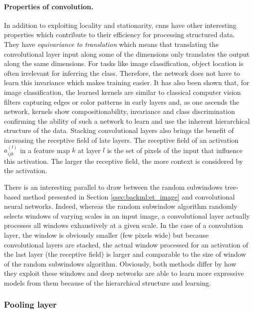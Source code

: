 \paragraph{Properties of convolution.} In addition to exploiting locality and 
stationarity, \acrshort{cnn}s have other
interesting properties which contribute to their efficiency for processing structured
data. They have \textit{equivariance to translation} which means that translating
the convolutional layer input along some of the dimensions only translates the
output along the same dimensions. For tasks like image classification, object
location is often irrelevant for inferring the class. Therefore, the network does
not have to learn this invariance which makes training easier. It has also been
shown that, for image classification, the learned kernels are similar to classical
computer vision filters capturing edges or color patterns in early layers and, as
one ascends the network, kernels show compositionability, invariance and class
discrimination \cite{zeiler2014visualizing} confirming the ability of such
a network to learn and use the inherent hierarchical structure of the data. Stacking
convolutional layers also brings the benefit of increasing the receptive field of
late layers. The receptive field of an activation $a^{(l)}_{ijk}$ in a feature
map $k$ at layer $l$ is the set of pixels of the input that influence this
activation. The larger the receptive field, the more context is considered by the
activation.

There is an interesting parallel to draw between the random subwindows tree-based method presented in Section \ref{ssec:backml:et_image} and convolutional neural networks. Indeed, whereas the random subwindow algorithm randomly selects windows of varying scales in an input image, a convolutional layer actually processes all windows exhaustively at a given scale. In the case of a convolution layer, the window is obviously smaller (\ie few pixels wide) but because convolutional layers are stacked, the actual window processed for an activation of the last layer (\ie the receptive field) is larger and comparable to the size of window of the random subwindows algorithm. Obviously, both methods differ by how they exploit these windows and deep networks are able to learn more expressive models from them because of the hierarchical structure and learning. 

\subsubsection{Pooling layer}
\label{sssec:backml:poolinglayer}


